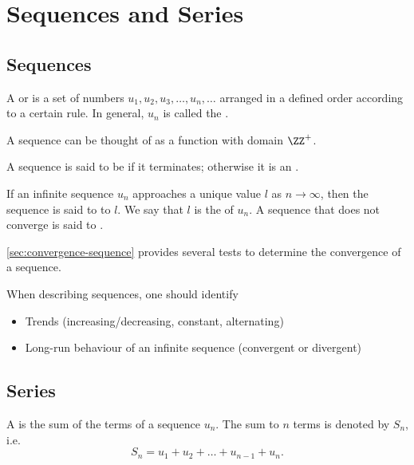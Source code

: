 \chapter{Sequences and Series}\label{chap:Sequences-and-Series}

\section{Sequences}

\begin{definition}
    A  or  is a set of numbers $u_1, u_2, u_3, \dots, u_n, \dots$ arranged in a defined order according to a certain rule. In general, $u_n$ is called the .
\end{definition}

\begin{remark}
    A sequence can be thought of as a function with domain $\ZZ^+$.
\end{remark}

\begin{definition}
    A sequence is said to be  if it terminates; otherwise it is an .
\end{definition}

\begin{definition}
    If an infinite sequence $u_n$ approaches a unique value $l$ as $n \to \infty$, then the sequence is said to  to $l$. We say that $l$ is the  of $u_n$. A sequence that does not converge is said to .
\end{definition}

\SS\ref{sec:convergence-sequence} provides several tests to determine the convergence of a sequence.

When describing sequences, one should identify
\begin{itemize}
    \item Trends (increasing/decreasing, constant, alternating)
    \item Long-run behaviour of an infinite sequence (convergent or divergent)
\end{itemize}

\section{Series}

\begin{definition}
    A  is the sum of the terms of a sequence $u_n$. The sum to $n$ terms is denoted by $S_n$, i.e. \[S_n = u_1 + u_2 + \dots + u_{n-1} + u_n.\]
\end{definition}


